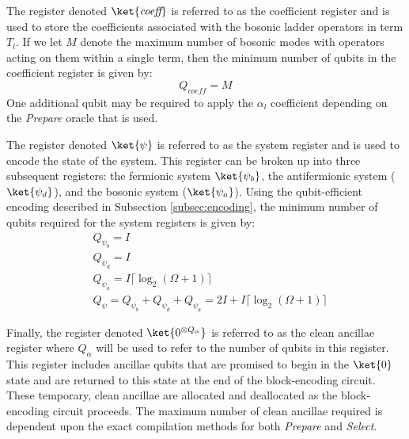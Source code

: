 The register denoted $\ket{\textit{coeff}}$ is referred to as the coefficient register and is used to store the coefficients associated with the bosonic ladder operators in term $T_l$. 
If we let $M$ denote the maximum number of bosonic modes with operators acting on them within a single term, then the minimum number of qubits in the coefficient register is given by:
\begin{equation}
    Q_{\textit{coeff}} = M 
\end{equation} 
One additional qubit may be required to apply the $\alpha_l$ coefficient depending on the \textit{Prepare} oracle that is used.

The register denoted $\ket{\psi}$ is referred to as the system register and is used to encode the state of the system.
This register can be broken up into three subsequent registers: the fermionic system $\ket{\psi_b}$, the antifermionic system ($\ket{\psi_d}$), and the bosonic system ($\ket{\psi_a}$).
Using the qubit-efficient encoding described in Subsection \ref{subsec:encoding}, the minimum number of qubits required for the system registers is given by:
\begin{equation}
    \begin{split}
        &Q_{\psi_b} = I \\
        &Q_{\psi_d} = I \\
        &Q_{\psi_a} = I \lceil \log_2{(\Omega + 1)} \rceil \\
        &Q_{\psi} = Q_{\psi_b} + Q_{\psi_d} + Q_{\psi_a} = 2I + I\lceil \log_2{(\Omega + 1)} \rceil
    \end{split}
\end{equation} 

Finally, the register denoted $\ket{0^{\otimes Q_\alpha}}$ is referred to as the clean ancillae register where $Q_\alpha$ will be used to refer to the number of qubits in this register.
This register includes ancillae qubits that are promised to begin in the $\ket{0}$ state and are returned to this state at the end of the block-encoding circuit.
These temporary, clean ancillae are allocated and deallocated as the block-encoding circuit proceeds.
The maximum number of clean ancillae required is dependent upon the exact compilation methods for both \textit{Prepare} and \textit{Select}.

